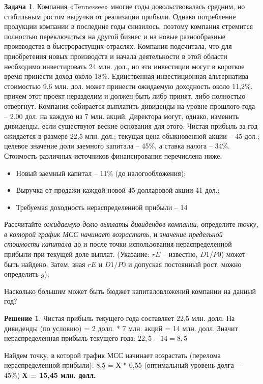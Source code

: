 \documentclass[a4paper, 14pt]{article}
\theoremstyle{plain} %
\theoremstyle{definition} %
\newtheorem*{solution}{Решение}
\newtheorem{problem}{Задача}[subsection]
\theoremstyle{remark} %
\begin{document}
\begin{problem}
	Компания «Tennessee» многие годы довольствовалась средним, но стабильным ростом выручки от реализации прибыли. Однако потребление продукции компании в последние годы снизилось, поэтому компания стремится полностью переключиться на другой бизнес и на новые разнообразные производства в быстрорастущих отраслях. Компания подсчитала, что для приобретения новых производств и начала деятельности в этой области необходимо инвестировать 24 млн. дол., но эти инвестиции могут в короткое время принести доход около 18\%. Единственная инвестиционная альтернатива стоимостью 9,6 млн. дол. может принести ожидаемую доходность около 11,2\%, причем этот проект неразделим и должен быть либо принят, либо полностью отвергнут. Компания собирается выплатить дивиденды на уровне прошлого года – 2.00 дол. на каждую из 7 млн. акций. Директора могут, однако, изменить дивиденды, если существуют веские основания для этого. Чистая прибыль за год ожидается в размере 22,5 млн. дол.; текущая цена обыкновенной акции – 45 дол.; целевое значение доли заемного капитала – 45\%, а ставка налога – 34\%. Стоимость различных источников финансирования перечислена ниже:
	\begin{itemize}
		\item Новый заемный капитал – 11\% (до налогообложения);
		\item Выручка от продажи каждой новой 45-долларовой акции 41 дол.;
		\item Требуемая доходность нераспределенной прибыли – 14%
	\end{itemize}
	Рассчитайте \emph{ожидаемую долю выплаты дивидендов компании}, определите \emph{точку, в которой график МСС начинает возрастать}, и \emph{значение предельной стоимости капитала} до и после точки использования нераспределенной прибыли при текущей доле выплат. (Указание:  $rE$ – известно,  $D1/P0$) может быть найдено. Затем, зная $rE$ и $D1/P0$ и допуская постоянный рост, можно определить $g$);

	Насколько большим может быть бюджет капиталовложений компании на данный год?
	\begin{solution}
		Чистая прибыль текущего года составляет 22,5 млн. долл. На дивиденды (по условию) = 2 долл. * 7 млн. акций = 14 млн. долл. Значит нераспределенная прибыль текущего года: $22,5 -14 = 8,5$

		Найдем точку, в которой график МСС начинает возрастать (перелома нераспределенной прибыли): 8,5 = Х * 0,55 (оптимальный уровень долга --- 45\%) \textbf{Х = 15,45 млн. долл.}


\end{solution}
\end{problem}
\end{document}
